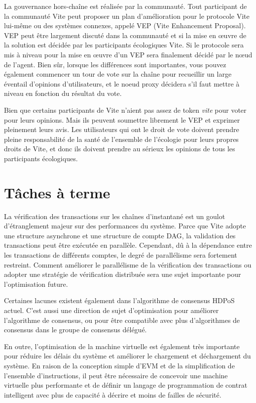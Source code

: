 \documentclass[UTF8,nofonts]{article}
\begin{document}
\begin{multicols}{2}
La gouvernance hors-chaîne est réalisée par la communauté. Tout participant de la communauté Vite peut proposer un plan d'amélioration pour le protocole Vite lui-même ou des systèmes connexes, appelé VEP (Vite Enhancement Proposal). VEP peut être largement discuté dans la communauté et si la mise en œuvre de la solution est décidée par les participants écologiques Vite. Si le protocole sera mis à niveau pour la mise en œuvre d'un VEP sera finalement décidé par le nœud de l'agent. Bien sûr, lorsque les différences sont importantes, vous pouvez également commencer un tour de vote sur la chaîne pour recueillir un large éventail d'opinions d'utilisateurs, et le noeud proxy décidera s'il faut mettre à niveau en fonction du résultat du vote.

Bien que certains participants de Vite n'aient pas assez de token \textit{vite} pour voter pour leurs opinions. Mais ils peuvent soumettre librement le VEP et exprimer pleinement leurs avis. Les utilisateurs qui ont le droit de vote doivent prendre pleine responsabilité de la santé de l'ensemble de l'écologie pour leurs propres droits de Vite, et donc ils doivent prendre au sérieux les opinions de tous les participants écologiques.


\section{Tâches à terme}
La vérification des transactions sur les chaînes d'instantané est un goulot d'étranglement majeur sur des performances du système. Parce que Vite adopte une structure asynchrone et une structure de compte DAG, la validation des transactions peut être exécutée en parallèle. Cependant, dû à la dépendance entre les transactions de différents comptes, le degré de parallélisme sera fortement restreint. Comment améliorer le parallélisme de la vérification des transactions ou adopter une stratégie de vérification distribuée sera une sujet importante pour l'optimisation future.

Certaines lacunes existent également dans l'algorithme de consensus HDPoS actuel. C'est aussi une direction de sujet d'optimisation pour améliorer l'algorithme de consensus, ou pour être compatible avec plus d'algorithmes de consensus dans le groupe de consensus délégué.

En outre, l'optimisation de la machine virtuelle est également très importante pour réduire les délais du système et améliorer le chargement et déchargement du système. En raison de la conception simple d'EVM et de la simplification de l'ensemble d'instructions, il peut être nécessaire de concevoir une machine virtuelle plus performante et de définir un langage de programmation de contrat intelligent avec plus de capacité à décrire et moins de failles de sécurité.


\end{multicols}
\end{document}
